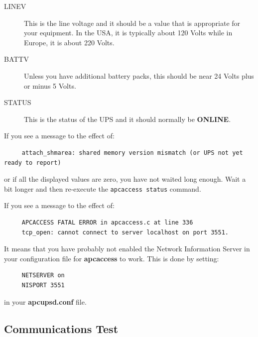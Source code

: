 {{\begin{description}

\item [LINEV]
   This is the line voltage and it should be a value that is appropriate for your
equipment. In the USA, it is typically about 120 Volts while in Europe, it is
about 220 Volts.  

\item [BATTV]
   Unless you have additional battery packs, this should be near 24 Volts plus or
minus 5 Volts.  

\item [STATUS]
   This is the status of the UPS and it should normally be {\bf ONLINE}. 
\end{description}

If you see a message to the effect of: 

\footnotesize
\begin{verbatim}
     attach_shmarea: shared memory version mismatch (or UPS not yet ready to report)
\end{verbatim}
\normalsize

or if all the displayed values are zero, you have not waited long enough. Wait
a bit longer and then re-execute the {\tt apcaccess status} command.  

If you see a message to the effect of: 

\footnotesize
\begin{verbatim}
     APCACCESS FATAL ERROR in apcaccess.c at line 336
     tcp_open: cannot connect to server localhost on port 3551.
\end{verbatim}
\normalsize

It means that you have probably not enabled the Network Information Server in
your configuration file for {\bf apcaccess} to work. This is done by setting: 

\footnotesize
\begin{verbatim}
     NETSERVER on
     NISPORT 3551
\end{verbatim}
\normalsize

in your {\bf apcupsd.conf} file. 

\label{Communications-Test}

\subsection*{Communications Test}

}}
